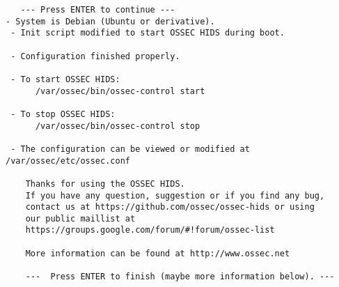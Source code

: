 \documentclass{article}
\begin{document}
\begin{verbatim}
   --- Press ENTER to continue ---
- System is Debian (Ubuntu or derivative).
 - Init script modified to start OSSEC HIDS during boot.

 - Configuration finished properly.

 - To start OSSEC HIDS:
      /var/ossec/bin/ossec-control start

 - To stop OSSEC HIDS:
      /var/ossec/bin/ossec-control stop

 - The configuration can be viewed or modified at /var/ossec/etc/ossec.conf

    Thanks for using the OSSEC HIDS.
    If you have any question, suggestion or if you find any bug,
    contact us at https://github.com/ossec/ossec-hids or using
    our public maillist at
    https://groups.google.com/forum/#!forum/ossec-list

    More information can be found at http://www.ossec.net

    ---  Press ENTER to finish (maybe more information below). ---
\end{verbatim}
\end{document}

